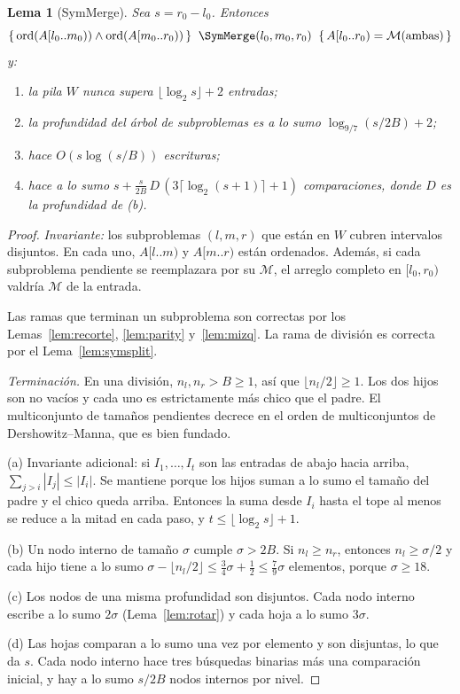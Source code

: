 \documentclass[10pt,a4paper]{article}
\theoremstyle{plain}
\newtheorem{lema}[teorema]{Lema}
\theoremstyle{definition}
\theoremstyle{remark}
\newcommand{\Bsz}{B}
\newcommand{\Mrg}{\mathcal{M}}
\newcommand{\hoare}[3]{\{\,#1\,\}\;\;#2\;\;\{\,#3\,\}}
\newcommand{\sortd}{\operatorname{ord}}
\begin{document}
\begin{lema}[SymMerge]\label{lem:sym}
Sea $s=r_0-l_0$. Entonces
\[
\hoare{\sortd(A[l_0..m_0))\wedge\sortd(A[m_0..r_0))}{\SymMerge(l_0,m_0,r_0)}{A[l_0..r_0)=\Mrg(\text{ambas})}
\]
y:
\begin{enumerate}[label=(\alph*),nosep]
\item la pila $W$ nunca supera $\lfloor\log_2 s\rfloor+2$ entradas;
\item la profundidad del árbol de subproblemas es a lo sumo
  $\log_{9/7}(s/2\Bsz)+2$;
\item hace $O(s\log(s/\Bsz))$ escrituras;
\item hace a lo sumo $s+\frac{s}{2\Bsz}\,D\,(3\lceil\log_2(s{+}1)\rceil+1)$
  comparaciones, donde $D$ es la profundidad de (b).
\end{enumerate}
\end{lema}
\begin{proof}
\emph{Invariante:} los subproblemas $(l,m,r)$ que están en $W$ cubren intervalos
disjuntos. En cada uno, $A[l..m)$ y $A[m..r)$ están ordenados. Además, si cada
subproblema pendiente se reemplazara por su $\Mrg$, el arreglo completo en
$[l_0,r_0)$ valdría $\Mrg$ de la entrada.

Las ramas que terminan un subproblema son correctas por los
Lemas~\ref{lem:recorte}, \ref{lem:parity} y~\ref{lem:mizq}. La rama de división es
correcta por el Lema~\ref{lem:symsplit}.

\emph{Terminación.} En una división, $n_l,n_r>\Bsz\ge 1$, así que
$\lfloor n_l/2\rfloor\ge 1$. Los dos hijos son no vacíos y cada uno es estrictamente
más chico que el padre. El multiconjunto de tamaños pendientes decrece en el orden de
multiconjuntos de Dershowitz--Manna, que es bien fundado.

(a) Invariante adicional: si $I_1,\dots,I_t$ son las entradas de abajo hacia arriba,
$\sum_{j>i}|I_j|\le|I_i|$. Se mantiene porque los hijos suman a lo sumo el tamaño del
padre y el chico queda arriba. Entonces la suma desde $I_i$ hasta el tope al menos se
reduce a la mitad en cada paso, y $t\le\lfloor\log_2 s\rfloor+1$.

(b) Un nodo interno de tamaño $\sigma$ cumple $\sigma>2\Bsz$. Si $n_l\ge n_r$,
entonces $n_l\ge\sigma/2$ y cada hijo tiene a lo sumo
$\sigma-\lfloor n_l/2\rfloor\le\frac34\sigma+\frac12\le\frac79\sigma$ elementos,
porque $\sigma\ge 18$.

(c) Los nodos de una misma profundidad son disjuntos. Cada nodo interno escribe a lo
sumo $2\sigma$ (Lema~\ref{lem:rotar}) y cada hoja a lo sumo $3\sigma$.

(d) Las hojas comparan a lo sumo una vez por elemento y son disjuntas, lo que da $s$.
Cada nodo interno hace tres búsquedas binarias más una comparación inicial, y hay a lo
sumo $s/2\Bsz$ nodos internos por nivel.
\end{proof}
\end{document}
